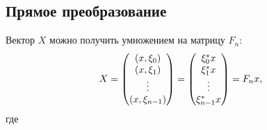 \subsection{Прямое преобразование}

Вектор $X$ можно получить умножением на матрицу $F_n$:
\[
    X
    = \begin{pmatrix}
        \left ( x, \xi_0 \right )     \\
        \left ( x, \xi_1 \right )     \\
        \vdots                       \\
        \left ( x, \xi_{n-1} \right ) \\
    \end{pmatrix}
    = \begin{pmatrix}
        \xi_0^* x     \\
        \xi_1^* x     \\
        \vdots        \\
        \xi_{n-1}^* x \\
    \end{pmatrix}
    = F_n x ,
\]
где
